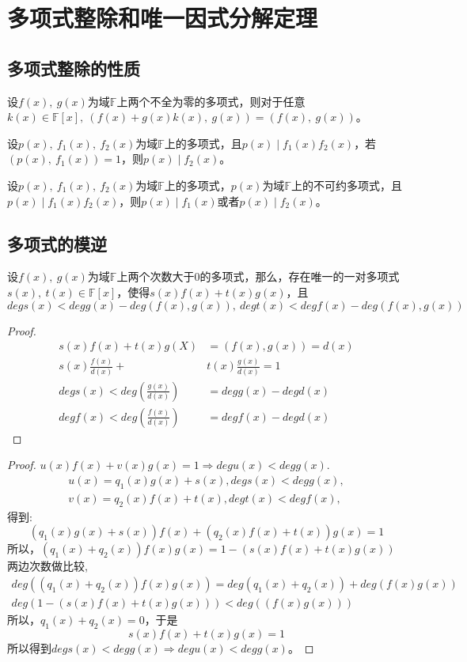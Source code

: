 \documentclass[cn,10pt]{elegantbook}
\begin{document}
\section{多项式整除和唯一因式分解定理}
\subsection{多项式整除的性质}
\begin{theorem}
  设$f(x),\ g(x)$为域$\mathbb{F}$上两个不全为零的多项式，则对于任意$k(x) \in \mathbb{F}[x],\ (f(x)+g(x)k(x),\ g(x))=(f(x),\ g(x))$。
\end{theorem}
\begin{theorem}
  设$p(x),\ f_1(x),\ f_2(x)$为域$\mathbb{F}$上的多项式，且$p(x) \mid f_1(x)f_2(x)$，若$(p(x),\ f_1(x))=1$，则$p(x) \mid f_2(x)$。
\end{theorem}
\begin{theorem}
  设$p(x),\ f_1(x),\ f_2(x)$为域$\mathbb{F}$上的多项式，$p(x)$为域$\mathbb{F}$上的不可约多项式，且$p(x) \mid f_1(x)f_2(x)$，则$p(x)\mid f_1(x)$或者$p(x) \mid f_2(x)$。
\end{theorem}
\subsection{多项式的模逆}
\begin{conclusion}
  设$f(x),\ g(x)$为域$\mathbb{F}$上两个次数大于0的多项式，那么，存在唯一的一对多项式$s(x),\ t(x) \in \mathbb{F}[x]$，使得$s(x)f(x)+t(x)g(x)$，且$degs(x)<degg(x)-deg(f(x),g(x)),\ degt(x)<degf(x)-deg(f(x),g(x))$
\end{conclusion}
\begin{proof}
  \begin{align*}
    s(x)f(x)+t(x)g(X)&=(f(x),g(x))=d(x)
    \\s(x)\frac{f(x)}{d(x)}+&t(x)\frac{g(x)}{d(x)} = 1
    \\degs(x)<deg(\frac{g(x)}{d(x)})&=degg(x)-degd(x)
    \\degf(x)<deg(\frac{f(x)}{d(x)})&=degf(x)-degd(x)
  \end{align*}
\end{proof}
\begin{proof}
  $u(x)f(x)+v(x)g(x)=1 \Rightarrow degu(x)<degg(x).$
  \begin{align*}
    u(x)=q_1(x)g(x)+s(x), degs(x)<degg(x),
    \\v(x)=q_2(x)f(x)+t(x), degt(x)<degf(x),
  \end{align*}
  得到:
  \begin{equation*}
    (q_1(x)g(x)+s(x))f(x)+(q_2(x)f(x)+t(x))g(x)=1
  \end{equation*}
  所以，$(q_1(x)+q_2(x))f(x)g(x)=1-(s(x)f(x)+t(x)g(x))$
  \\两边次数做比较,
  \begin{align*}
    deg((q_1(x)+q_2(x))f(x)g(x))=deg(q_1(x)+q_2(x))+deg(f(x)g(x))
    \\deg(1-(s(x)f(x)+t(x)g(x)))<deg((f(x)g(x)))
  \end{align*}
  所以，$q_1(x)+q_2(x)=0$，于是
  \begin{equation*}
    s(x)f(x)+t(x)g(x)=1
  \end{equation*}
  所以得到$degs(x)<degg(x) \Rightarrow degu(x)<degg(x)$。
\end{proof}
\end{document}
